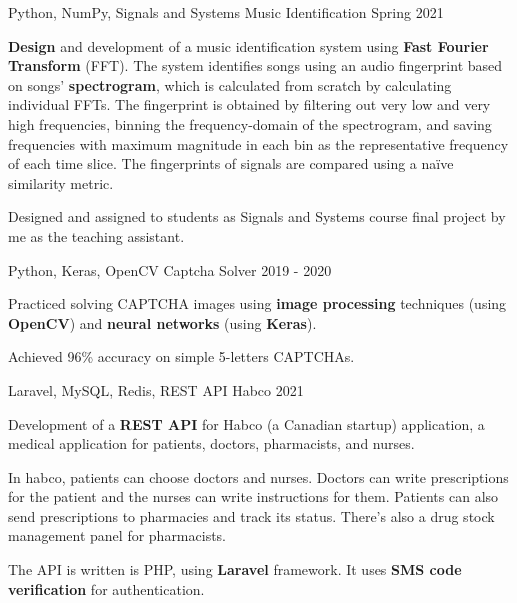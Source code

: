 \begin{cventries}
  \cventry
    {Python, NumPy, Signals and Systems} %
    {Music Identification} %
    {} %
    {Spring 2021} %
    {
      \begin{cvitems} %
      	\item {\textbf{Design} and development of a music identification system using \textbf{Fast Fourier Transform} (FFT). The system identifies songs using an audio fingerprint based on songs' \textbf{spectrogram}, which is calculated from scratch by calculating individual FFTs. The fingerprint is obtained by filtering out very low and very high frequencies, binning the frequency-domain of the spectrogram, and saving frequencies with maximum magnitude in each bin as the representative frequency of each time slice. The fingerprints of signals are compared using a naïve similarity metric.}
        \item {Designed and assigned to students as Signals and Systems course final project by me as the teaching assistant.}
      \end{cvitems}
    }

  \cventry
    {Python, Keras, OpenCV} %
    {Captcha Solver} %
    {} %
    {2019 - 2020} %
    {
      \begin{cvitems} %
      	\item {Practiced solving CAPTCHA images using \textbf{image processing} techniques (using \textbf{OpenCV}) and \textbf{neural networks} (using \textbf{Keras}).}
      	\item {Achieved 96\% accuracy on simple 5-letters CAPTCHAs.}
      \end{cvitems}
    }
    
  \cventry
    {Laravel, MySQL, Redis, REST API} %
    {Habco} %
    {} %
    {2021} %
    {
      \begin{cvitems} %
      	\item {Development of a \textbf{REST API} for Habco (a Canadian startup) application, a medical application for patients, doctors, pharmacists, and nurses.}
      	\item {In habco, patients can choose doctors and nurses. Doctors can write prescriptions for the patient and the nurses can write instructions for them. Patients can also send prescriptions to pharmacies and track its status. There's also a drug stock management panel for pharmacists.}
      	\item {The API is written is PHP, using \textbf{Laravel} framework. It uses \textbf{SMS code verification} for authentication.}
      \end{cvitems}
    }


\end{cventries}
